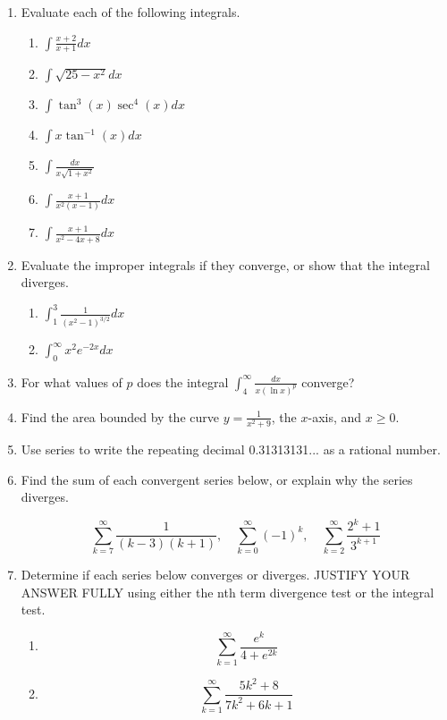\documentclass[12pt]{article}
\begin{document}
\begin{enumerate}
\item 
Evaluate each of the following integrals.
\medskip
\begin{enumerate}
\item $\int {\frac{x+2}{x+1}} dx$
\medskip
\item  $\int \sqrt{25-x^2} dx$
\medskip
\item  $\int \tan^{3}(x) \sec^{4}(x) dx$
\medskip
\item  $\int x \tan^{-1}(x) dx$
\medskip
\item $\int {\frac{dx}{x \sqrt{1+x^2}}}$
\medskip
\item $\int {\frac{x+1}{x^2(x-1)}} dx$ 
\medskip
\item $\int {\frac{x+1}{x^2-4x+8}} dx$
\medskip
\end{enumerate}

\item  Evaluate the improper integrals if they converge, or show 
that the integral diverges.
\begin{enumerate}
\item $\int_1^3 {\frac{1}{(x^2-1)^{3/2}}} dx$
\medskip
\item $\int_0^{\infty} x^2 e^{-2x}dx$ 
\medskip
\end{enumerate}

\item  For what values of $p$ does the integral
$\int_4^{\infty} {\frac{dx}{x (\ln x)^p}}$ converge?
\medskip

\item Find the area bounded by the curve 
$y={\frac{1}{x^2+9}}$, the $x$-axis, and $x \ge 0$.
\medskip

\item Use series to write the repeating decimal 0.31313131... as a 
rational number.
\medskip

\item Find the sum of each convergent series below, or explain why 
the series diverges.

$$\sum_{k=7}^{\infty} {\frac{1}{(k-3)(k+1)}}, \quad
\sum_{k=0}^{\infty} (-1)^k, \quad
\sum_{k=2}^{\infty} {\frac{2^k + 1}{3^{k+1}}}$$
\medskip

\item Determine if each series below converges or diverges.  JUSTIFY 
YOUR ANSWER FULLY using either the nth term divergence test or the integral 
test. 

\begin{enumerate}
\item $$\sum_{k=1}^{\infty} {\frac{e^k}{4+e^{2k}}}$$
\medskip
\item $$\sum_{k=1}^{\infty} {\frac{5k^2+8}{7k^2+6k+1}}$$
\medskip
\end{enumerate}


\end{enumerate}
\end{document}
